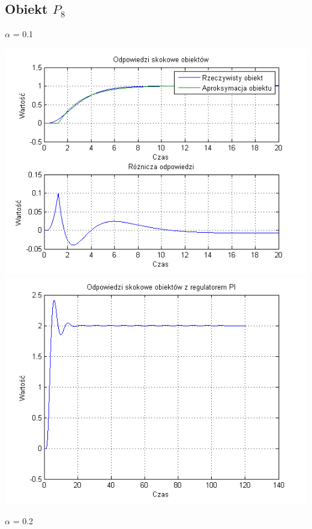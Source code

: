 \documentclass[10pt,a4paper]{article}
\begin{document}
\subsection{Obiekt $P_8$}
$\alpha$ = 0.1
\begin{center}
\includegraphics[scale=1]{images/jeden/skrypt_225.png}\\
\includegraphics[scale=1]{images/jeden/skrypt_226.png}\\
\end{center}
\newpage
$\alpha$ = 0.2
\end{document}
